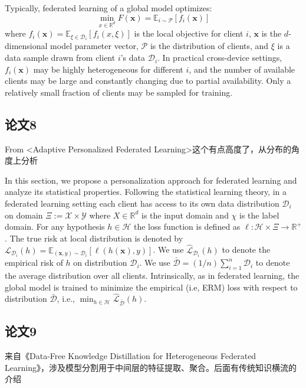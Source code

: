 Typically, federated learning of a global model optimizes: 
\begin{equation*}
    \min_{x\in\mathbb{R}^d}F(\mathbf{x})=\mathbb{E}_{i\sim \mathcal{P}}[f_i(\mathbf{x})]
\end{equation*}
where $f_i(\mathbf{x})=\mathbb{E}_{\xi\in\mathcal{D}_i}[f_i(x,\xi)]$ is the local objective for client $i$, $\mathbf{x}$ is the $d$-dimensional model parameter vector, $\mathcal{P}$ is the distribution of clients, and $\xi$ is a data sample drawn from client $i$'s data $\mathcal{D}_i$. In practical cross-device settings, $f_i(\mathbf{x})$ may be highly heterogeneous for different $i$, and the number of available clients may be large and constantly changing due to partial availability. Only a relatively small fraction of clients may be sampled for training.
\subsection{论文8}
From <Adaptive Personalized Federated Learning>这个有点高度了，从分布的角度上分析

In this section, we propose a personalization approach for federated learning and analyze its statistical properties.
Following the statistical learning theory, in a federated learning setting each client has access to its own data distribution $\mathcal{D}_i$ on domain $\Xi:=\mathcal{X}\times\mathcal{Y}$ where $X\in\mathbb{R}^d$ is the input domain and $\chi$ is the label domain. For any hypothesis $h\in\mathcal{H}$ the loss function is defined as $\ell:\mathcal{H}\times\Xi\to\mathbb{R}^+$. The true risk at local distribution is denoted by $\mathcal{L}_{\mathcal{D}_i}(h)=\mathbb{E}_{(\boldsymbol{x},y)\sim\mathcal{D}_i}\left[\ell\left(h(\boldsymbol{x}),y\right)\right]$. We use $\hat{\mathcal{L}}_{\mathcal{D}_i}(h)$ to denote the empirical risk of $h$ on distribution $\mathcal{D}_i$. We use $\bar{\mathcal{D}}=(1/n)\sum_{i=1}^n\mathcal{D}_i$ to denote the average distribution over all clients. Intrinsically, as in federated learning, the global model is trained to minimize the empirical (i.e, ERM) loss with respect to distribution $\bar{\mathcal{D}}$, i.e., $\min_{h\in\mathcal{H}}\hat{\mathcal{L}}_{\bar{\mathcal{D}}}(h)$.

\subsection{论文9}
来自《Data-Free Knowledge Distillation for Heterogeneous Federated Learning》，涉及模型分割用于中间层的特征提取、聚合。后面有传统知识横流的介绍

